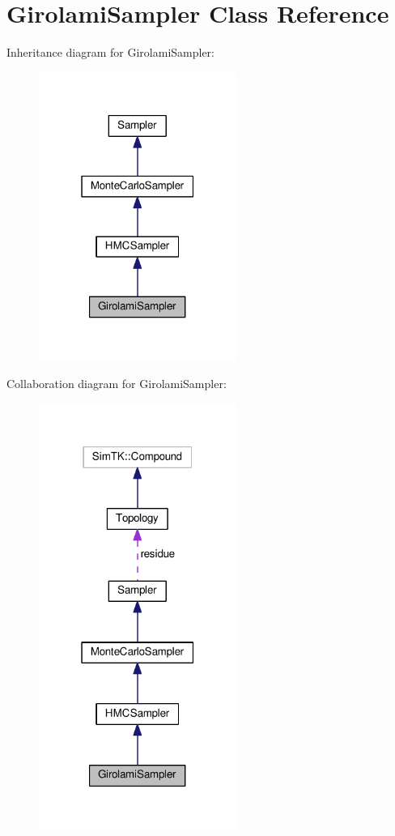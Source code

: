 \hypertarget{classGirolamiSampler}{}\section{Girolami\+Sampler Class Reference}
\label{classGirolamiSampler}


Inheritance diagram for Girolami\+Sampler\+:\nopagebreak
\begin{figure}[H]
\begin{center}
\leavevmode
\includegraphics[width=183pt]{classGirolamiSampler__inherit__graph}
\end{center}
\end{figure}


Collaboration diagram for Girolami\+Sampler\+:\nopagebreak
\begin{figure}[H]
\begin{center}
\leavevmode
\includegraphics[width=183pt]{classGirolamiSampler__coll__graph}
\end{center}
\end{figure}
